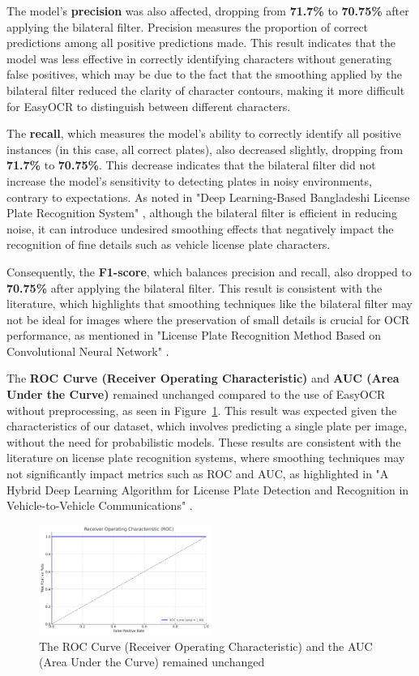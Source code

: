 \documentclass[conference]{IEEEtran}
\begin{document}
	The model's \textbf{precision} was also affected, dropping from \textbf{71.7\%} to \textbf{70.75\%} after applying the bilateral filter. Precision measures the proportion of correct predictions among all positive predictions made. This result indicates that the model was less effective in correctly identifying characters without generating false positives, which may be due to the fact that the smoothing applied by the bilateral filter reduced the clarity of character contours, making it more difficult for EasyOCR to distinguish between different characters.
	
	The \textbf{recall}, which measures the model's ability to correctly identify all positive instances (in this case, all correct plates), also decreased slightly, dropping from \textbf{71.7\%} to \textbf{70.75\%}. This decrease indicates that the bilateral filter did not increase the model's sensitivity to detecting plates in noisy environments, contrary to expectations. As noted in "Deep Learning-Based Bangladeshi License Plate Recognition System" \cite{b11}, although the bilateral filter is efficient in reducing noise, it can introduce undesired smoothing effects that negatively impact the recognition of fine details such as vehicle license plate characters.
	
	Consequently, the \textbf{F1-score}, which balances precision and recall, also dropped to \textbf{70.75\%} after applying the bilateral filter. This result is consistent with the literature, which highlights that smoothing techniques like the bilateral filter may not be ideal for images where the preservation of small details is crucial for OCR performance, as mentioned in "License Plate Recognition Method Based on Convolutional Neural Network" \cite{b14}.
	
	The \textbf{ROC Curve (Receiver Operating Characteristic)} and \textbf{AUC (Area Under the Curve)} remained unchanged compared to the use of EasyOCR without preprocessing, as seen in Figure~\ref{img13}. This result was expected given the characteristics of our dataset, which involves predicting a single plate per image, without the need for probabilistic models. These results are consistent with the literature on license plate recognition systems, where smoothing techniques may not significantly impact metrics such as ROC and AUC, as highlighted in "A Hybrid Deep Learning Algorithm for License Plate Detection and Recognition in Vehicle-to-Vehicle Communications" \cite{b7}.
	
	\begin{figure}[htbp]
		\centerline{\includegraphics[width=0.5\textwidth]{img13.png}}
		\caption{The ROC Curve (Receiver Operating Characteristic) and the AUC (Area Under the Curve) remained unchanged}
		\label{img13}
	\end{figure}
	
\end{document}

